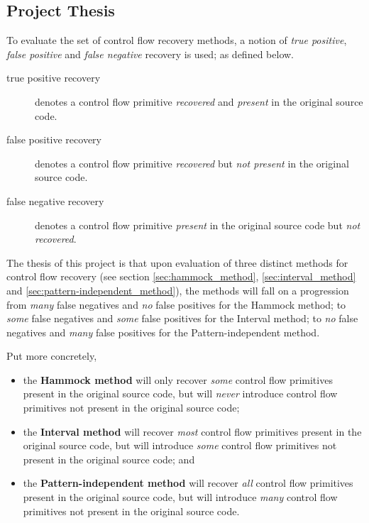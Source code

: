 
\subsection{Project Thesis}
\label{sec:project_thesis}


To evaluate the set of control flow recovery methods, a notion of \textit{true positive}, \textit{false positive} and \textit{false negative} recovery is used; as defined below.

\begin{description}
	\item[true positive recovery] denotes a control flow primitive \textit{recovered} and \textit{present} in the original source code.
	\item[false positive recovery] denotes a control flow primitive \textit{recovered} but \textit{not present} in the original source code.
	\item[false negative recovery] denotes a control flow primitive \textit{present} in the original source code but \textit{not recovered}.
\end{description}

The thesis of this project is that upon evaluation of three distinct methods for control flow recovery (see section \ref{sec:hammock_method}, \ref{sec:interval_method} and \ref{sec:pattern-independent_method}), the methods will fall on a progression from \textit{many} false negatives and \textit{no} false positives for the Hammock method; to \textit{some} false negatives and \textit{some} false positives for the Interval method; to \textit{no} false negatives and \textit{many} false positives for the Pattern-independent method.

Put more concretely,
\begin{itemize}
	\item the \textbf{Hammock method} will only recover \textit{some} control flow primitives present in the original source code, but will \textit{never} introduce control flow primitives not present in the original source code;
	\item the \textbf{Interval method} will recover \textit{most} control flow primitives present in the original source code, but will introduce \textit{some} control flow primitives not present in the original source code; and
	\item the \textbf{Pattern-independent method} will recover \textit{all} control flow primitives present in the original source code, but will introduce \textit{many} control flow primitives not present in the original source code.
\end{itemize}
